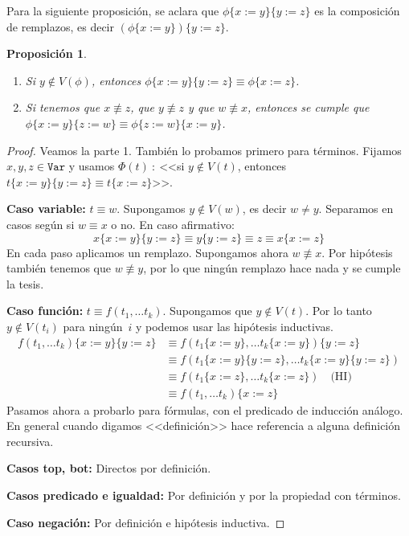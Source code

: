 \documentclass[a4paper, 12pt]{report}
\newcommand{\te}{\text}
\newtheorem{prop}[teorema]{Proposición}
\theoremstyle{definition}
\begin{document}
Para la siguiente proposición, se aclara que $\phi\{x:=y\}\{y:=z\}$ es la composición de remplazos, es decir $(\phi\{x:=y\})\{y:=z\}$.
\begin{prop}\label{prop-RemplVar2}
	\begin{enumerate}
		\item Si $y\not\in V(\phi)$, entonces $\phi\{x:=y\}\{y:=z\}\equiv \phi\{x:=z\}$.
		\item Si tenemos que $x\not\equiv z$, que $y\not\equiv z$ y que $w\not\equiv x$, entonces se cumple que\linebreak $\phi\{x:=y\}\{z:=w\}\equiv\phi\{z:=w\}\{x:=y\}$.
	\end{enumerate}
\end{prop}
\begin{proof}
	Veamos la parte 1. También lo probamos primero para términos. Fijamos $x,y,z\in\mathtt{Var}$ y usamos $\Phi(t)~:~$<<si $y\not\in V(t)$, entonces $t\{x:=y\}\{y:=z\}\equiv t\{x:=z\}$>>.
	
	\textbf{Caso variable:} $t\equiv w$. Supongamos $y\not\in V(w)$, es decir $w\not=y$. Separamos en casos según si $w\equiv x$ o no. En caso afirmativo:
	$$ x\{x:=y\}\{y:=z\}\equiv y\{y:=z\}\equiv z\equiv x\{x:=z\}
	$$
	En cada paso aplicamos un remplazo. Supongamos ahora $w\not\equiv x$. Por hipótesis también tenemos que $w\not \equiv y$, por lo que ningún remplazo hace nada y se cumple la tesis.
	
	\textbf{Caso función:} $t\equiv f(t_1,\dots t_k)$. Supongamos que $y\not\in V(t)$. Por lo tanto $y\not\in V(t_i)$ para ningún~$i$ y podemos usar las hipótesis inductivas.
	\begin{align*}
		f(t_1,\dots t_k)\{x:=y\}\{y:=z\}&\equiv f(t_1\{x:=y\},\dots t_k\{x:=y\})\{y:=z\} \\
		 &\equiv f(t_1\{x:=y\}\{y:=z\},\dots t_k\{x:=y\}\{y:=z\}) \\
		 &\equiv f(t_1\{x:=z\},\dots t_k\{x:=z\}) \quad \te{(HI)}\\
		 &\equiv f(t_1,\dots t_k)\{x:=z\}
	\end{align*}
	Pasamos ahora a probarlo para fórmulas, con el predicado de inducción análogo. En general cuando digamos <<definición>> hace referencia a alguna definición recursiva.
	
	\textbf{Casos top, bot:} Directos por definición.
	
	\textbf{Casos predicado e igualdad:} Por definición y por la propiedad con términos.
	
	\textbf{Caso negación:} Por definición e hipótesis inductiva.
	

\end{proof}
\end{document}

